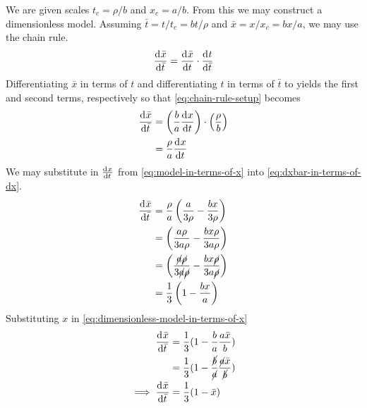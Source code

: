 \documentclass[12pt]{article}
\begin{document}
We are given scales $t_c=\rho/b$ and $x_c=a/b$. From this we may construct a
dimensionless model. Assuming $\bar{t}=t/t_c=bt/\rho$ and $\bar{x}=x/x_c=bx/a$, we may use
the chain rule.
\begin{equation}
  \label{eq:chain-rule-setup}
  \frac{\mathrm{d}^{} {\bar{x}}}{\mathrm{d}{\bar{t}}^{}} = \frac{\mathrm{d}^{} {\bar{x}}}{\mathrm{d}{t}^{}} \cdot \frac{\mathrm{d}^{} {t}}{\mathrm{d}{\bar{t}}^{}}
\end{equation}
Differentiating $\bar{x}$ in terms of $t$ and differentiating $t$ in terms of
$\bar{t}$ to yields the first and second terms, respectively so that
\cref{eq:chain-rule-setup} becomes
\begin{equation}
  \label{eq:dxbar-in-terms-of-dx}
  \begin{aligned}
    \frac{\mathrm{d}^{} {\bar{x}}}{\mathrm{d}{\bar{t}}^{}} &= \left(\frac{b}{a}\frac{\mathrm{d}^{} {x}}{\mathrm{d}{t}^{}}\right)\cdot\left(\frac{\rho}{b}\right) \\
    &= \frac{\rho}{a}\frac{\mathrm{d}^{} {x}}{\mathrm{d}{t}^{}} \\
  \end{aligned}
\end{equation}
We may substitute in $\frac{\mathrm{d}^{} {x}}{\mathrm{d}{t}^{}}$ from \cref{eq:model-in-terms-of-x} into
\cref{eq:dxbar-in-terms-of-dx}.
\begin{equation}
  \label{eq:dimensionless-model-in-terms-of-x}
  \begin{aligned}
    \frac{\mathrm{d}^{} {\bar{x}}}{\mathrm{d}{\bar{t}}^{}} &= \frac{\rho}{a}\left(\frac{a}{3\rho} -
    \frac{bx}{3\rho}\right) \\ &= \left(\frac{a\rho}{3a\rho} -
    \frac{bx\rho}{3a\rho}\right) \\
    &= \left(\frac{\cancel{a}\cancel{\rho}}{3\cancel{a}\cancel{\rho}} -
    \frac{bx\cancel{\rho}}{3a\cancel{\rho}}\right) \\
    &= \frac{1}{3}\left(1-\frac{bx}{a}\right) \\
  \end{aligned}
\end{equation}
Substituting $x$ in \cref{eq:dimensionless-model-in-terms-of-x}
\begin{equation}
  \label{eq:dimensionless-model-in-terms-of-x-bar}
  \begin{aligned}
    \frac{\mathrm{d}^{} {\bar{x}}}{\mathrm{d}{\bar{t}}^{}} &= \frac{1}{3}(1-\frac{b}{a}\frac{a\bar{x}}{b}) \\
    &=
    \frac{1}{3}(1-\frac{\cancel{b}}{\cancel{a}}\frac{\cancel{a}\bar{x}}{\cancel{b}})
    \\
    \implies \frac{\mathrm{d}^{} {\bar{x}}}{\mathrm{d}{\bar{t}}^{}} &= \frac{1}{3}(1-\bar{x}) \\
  \end{aligned}
\end{equation}
\end{document}
